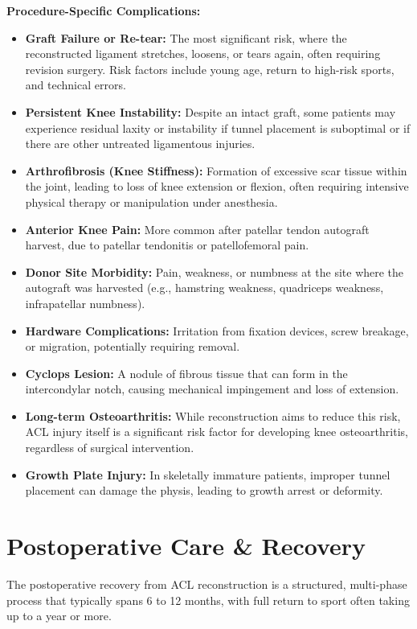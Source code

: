 \textbf{Procedure-Specific Complications:}
\begin{itemize}
  \item \textbf{Graft Failure or Re-tear:} The most significant risk, where the reconstructed ligament stretches, loosens, or tears again, often requiring revision surgery. Risk factors include young age, return to high-risk sports, and technical errors.
  
  \item \textbf{Persistent Knee Instability:} Despite an intact graft, some patients may experience residual laxity or instability if tunnel placement is suboptimal or if there are other untreated ligamentous injuries.
  
  \item \textbf{Arthrofibrosis (Knee Stiffness):} Formation of excessive scar tissue within the joint, leading to loss of knee extension or flexion, often requiring intensive physical therapy or manipulation under anesthesia.
  
  \item \textbf{Anterior Knee Pain:} More common after patellar tendon autograft harvest, due to patellar tendonitis or patellofemoral pain.
  
  \item \textbf{Donor Site Morbidity:} Pain, weakness, or numbness at the site where the autograft was harvested (e.g., hamstring weakness, quadriceps weakness, infrapatellar numbness).
  
  \item \textbf{Hardware Complications:} Irritation from fixation devices, screw breakage, or migration, potentially requiring removal.
  
  \item \textbf{Cyclops Lesion:} A nodule of fibrous tissue that can form in the intercondylar notch, causing mechanical impingement and loss of extension.
  
  \item \textbf{Long-term Osteoarthritis:} While reconstruction aims to reduce this risk, ACL injury itself is a significant risk factor for developing knee osteoarthritis, regardless of surgical intervention.
  
  \item \textbf{Growth Plate Injury:} In skeletally immature patients, improper tunnel placement can damage the physis, leading to growth arrest or deformity.
\end{itemize}

\section*{Postoperative Care \& Recovery}
The postoperative recovery from ACL reconstruction is a structured, multi-phase process that typically spans 6 to 12 months, with full return to sport often taking up to a year or more.


